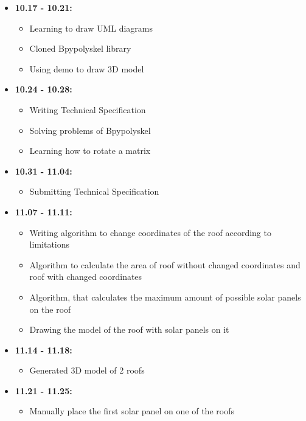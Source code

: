 \documentclass[a4paper,12pt,fleqn]{article}
\begin{document}
\begin{itemize}
    \item \textbf{10.17 - 10.21:}
    \begin{itemize}
        \item Learning to draw UML diagrams
        \item Cloned Bpypolyskel library
        \item Using demo to draw 3D model
    \end{itemize}
    
    \item \textbf{10.24 - 10.28:}
    \begin{itemize}
        \item Writing Technical Specification
        \item Solving problems of Bpypolyskel
        \item Learning how to rotate a matrix
    \end{itemize}
    
    \item \textbf{10.31 - 11.04:}
    \begin{itemize}
        \item Submitting Technical Specification
    \end{itemize}
    
    \item \textbf{11.07 - 11.11:}
    \begin{itemize}
        \item Writing algorithm to change coordinates of the roof according to limitations
        \item Algorithm to calculate the area of roof without changed coordinates and roof with changed coordinates
        \item Algorithm, that calculates the maximum amount of possible solar panels on the roof
        \item Drawing the model of the roof with solar panels on it
    \end{itemize}
    
    \item \textbf{11.14 - 11.18:}
    \begin{itemize}
        \item Generated 3D model of 2 roofs
    \end{itemize}
    
    \item \textbf{11.21 - 11.25:}
    \begin{itemize}
        \item Manually place the first solar panel on one of the roofs
    \end{itemize}
    

\end{itemize}
\end{document}
